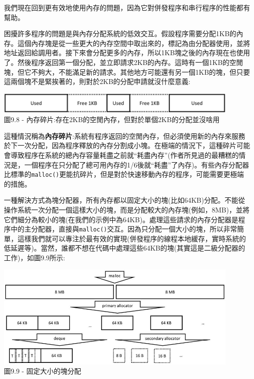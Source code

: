 我們現在回到更有效地使用內存的問題，因為它對併發程序和串行程序的性能都有幫助。


困擾許多程序的問題是與內存分配系統的低效交互。假設程序需要分配1KB的內存。這個內存塊是從一些更大的內存空間中取出來的，標記為由分配器使用，並將地址返回給調用者。接下來會分配更多的內存，所以1KB塊之後的內存現在也使用了。然後程序返回第一個分配，並立即請求2KB的內存。這時有一個1KB的空閒塊，但它不夠大，不能滿足新的請求。其他地方可能還有另一個1KB的塊，但只要這兩個塊不是緊挨著的，則對於2KB的分配申請就沒什麼意義:

\begin{center}
\includegraphics[width=0.9\textwidth]{content/3/chapter9/images/8.jpg}\\
圖9.8 - 內存碎片:存在2KB的空閒內存，但對於單個2KB的分配並沒啥用
\end{center}

這種情況稱為\textbf{內存碎片}:系統有程序返回的空閒內存，但必須使用新的內存來服務於下一次分配，因為程序釋放的內存分割成小塊。在極端的情況下，這種碎片可能會導致程序在系統的總內存容量耗盡之前就“耗盡內存”(作者所見過的最糟糕的情況是，一個程序在只分配了總可用內存的1/6後就“耗盡”了內存)。有些內存分配器比標準的\texttt{malloc()}更能抗碎片，但是對於快速移動內存的程序，可能需要更極端的措施。

一種解決方式為塊分配器，所有內存都以固定大小的塊(比如64KB)分配。不能從操作系統一次分配一個這樣大小的塊，而是分配較大的內存塊(例如，8MB)，並將它們細分為較小的塊(在我們的示例中為64KB)。處理這些請求的內存分配器是程序中的主分配器，直接與\texttt{malloc()}交互。因為只分配一個大小的塊，所以非常簡單，這樣我們就可以專注於最有效的實現(併發程序的線程本地緩存，實時系統的低延遲等)。當然，誰都不想在代碼中處理這些64KB的塊(其實這是二級分配器的工作)，如圖9.9所示:

\begin{center}
\includegraphics[width=0.9\textwidth]{content/3/chapter9/images/9.jpg}\\
圖9.9 - 固定大小的塊分配
\end{center}


